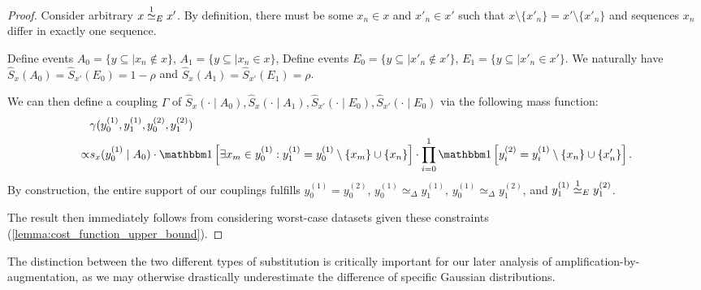 \begin{proof}
    Consider arbitrary $x \overset{1}{\simeq}_{E} x'$.
    By definition, there must be some $x_n \in x$ and $x'_n \in x'$
    such that $x \setminus \{x'_n\} = x' \setminus \{x'_n\}$
    and sequences $x_n$ differ in exactly one sequence.

    Define events $A_0 = \{y \subseteq \mid x_n \notin x\}$,
    $A_1 = \{y \subseteq \mid x_n \in x\}$,
    Define events $E_0 = \{y \subseteq \mid x'_n \notin x'\}$,
    $E_1 = \{y \subseteq \mid x'_n \in x'\}$.
    We naturally have $\hat{S}_x(A_0) = \hat{S}_{x'}(E_0) = 1 - \rho$
    and $\hat{S}_x(A_1) = \hat{S}_{x'}(E_1) = \rho$.

    We can then define a coupling $\Gamma$
    of $\hat{S}_{x}(\cdot \mid A_0),\hat{S}_{x}(\cdot \mid A_1),\hat{S}_{x'}(\cdot \mid E_0),\hat{S}_{x'}(\cdot \mid E_0)$
    via the following mass function:
    \begin{align*}
        &\gamma(y^{(1)}_0, y^{(1)}_1, y^{(2)}_0, y^{(2)}_1)
        \\
        \propto
        &
        s_x(y^{(1)}_0 \mid A_0)
        \cdot
        \indicator\left[
            \exists x_m \in y^{(1)}_0 : 
            y^{(1)}_1 = y^{(1)}_0 \setminus \{x_m\} \cup \{x_n\}
        \right]
        \cdot
        \prod_{i=0}^1
        \indicator\left[
            y^{(2)}_i = y^{(1)}_i \setminus \{x_n\} \cup \{x'_n\}
        \right].
    \end{align*}
    By construction, the entire support of our couplings fulfills 
    $y^{(1)}_0 = y^{(2)}_0$,
    $y^{(1)}_0 \simeq_\Delta y^{(1)}_1$,
    $y^{(1)}_0 \simeq_\Delta y^{(2)}_1$,
    and $y^{(1)}_1 \overset{1}{\simeq}_{E} y^{(2)}_1$.

    The result then immediately follows from considering worst-case datasets given these constraints (\cref{lemma:cost_function_upper_bound}).
\end{proof}
The distinction between the two different types of substitution is critically important
for our later analysis of amplification-by-augmentation, as we may otherwise drastically underestimate the difference of specific Gaussian distributions.

